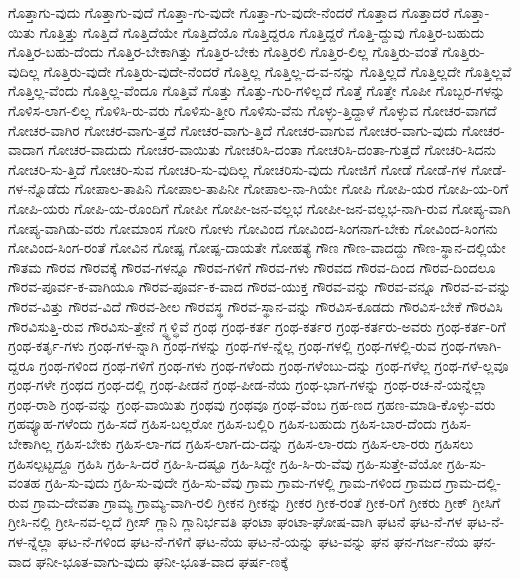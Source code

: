 {ಗೊತ್ತಾಗು-ವುದು
ಗೊತ್ತಾಗು-ವುದೆ
ಗೊತ್ತಾ-ಗು-ವುದೇ
ಗೊತ್ತಾ-ಗು-ವುದೇ-ನೆಂದರೆ
ಗೊತ್ತಾದ
ಗೊತ್ತಾದರೆ
ಗೊತ್ತಾ-ಯಿತು
ಗೊತ್ತಿತ್ತು
ಗೊತ್ತಿದೆ
ಗೊತ್ತಿದೆಯೇ
ಗೊತ್ತಿದೆಯೊ
ಗೊತ್ತಿದ್ದರೂ
ಗೊತ್ತಿದ್ದರೆ
ಗೊತ್ತಿ-ದ್ದುವು
ಗೊತ್ತಿರ-ಬಹುದು
ಗೊತ್ತಿರ-ಬಹು-ದೆಂದು
ಗೊತ್ತಿರ-ಬೇಕಾಗಿತ್ತು
ಗೊತ್ತಿರ-ಬೇಕು
ಗೊತ್ತಿರಲಿ
ಗೊತ್ತಿರ-ಲಿಲ್ಲ
ಗೊತ್ತಿರು-ವಂತೆ
ಗೊತ್ತಿರು-ವುದಿಲ್ಲ
ಗೊತ್ತಿರು-ವುದೇ
ಗೊತ್ತಿರು-ವುದೇ-ನೆಂದರೆ
ಗೊತ್ತಿಲ್ಲ
ಗೊತ್ತಿಲ್ಲ-ದ-ವ-ನನ್ನು
ಗೊತ್ತಿಲ್ಲದೆ
ಗೊತ್ತಿಲ್ಲದೇ
ಗೊತ್ತಿಲ್ಲವೆ
ಗೊತ್ತಿಲ್ಲ-ವೆಂದು
ಗೊತ್ತಿಲ್ಲ-ವೆಂದೂ
ಗೊತ್ತಿವೆ
ಗೊತ್ತು
ಗೊತ್ತು-ಗುರಿ-ಗಳಿಲ್ಲದೆ
ಗೊತ್ತೆ
ಗೊತ್ತೇ
ಗೊಪೀ
ಗೊಬ್ಬರ-ಗಳನ್ನು
ಗೊಳಿಸ-ಲಾಗ-ಲಿಲ್ಲ
ಗೊಳಿಸಿ-ರು-ವರು
ಗೊಳಿಸು-ತ್ತೀರಿ
ಗೊಳಿಸು-ವೆನು
ಗೊಳ್ಳು-ತ್ತಿದ್ದಾಳೆ
ಗೊಳ್ಳುವ
ಗೋಚರ-ವಾಗದೆ
ಗೋಚರ-ವಾಗಿರ
ಗೋಚರ-ವಾಗು-ತ್ತದೆ
ಗೋಚರ-ವಾಗು-ತ್ತಿದೆ
ಗೋಚರ-ವಾಗುವ
ಗೋಚರ-ವಾಗು-ವುದು
ಗೋಚರ-ವಾದಾಗ
ಗೋಚರ-ವಾದುದು
ಗೋಚರ-ವಾಯಿತು
ಗೋಚರಿಸಿ-ದಂತಾ
ಗೋಚರಿಸಿ-ದಂತಾ-ಗುತ್ತದೆ
ಗೋಚರಿ-ಸಿದನು
ಗೋಚರಿ-ಸು-ತ್ತಿದೆ
ಗೋಚರಿ-ಸುವ
ಗೋಚರಿ-ಸು-ವುದಿಲ್ಲ
ಗೋಚರಿಸು-ವುದು
ಗೋಜಿಗೆ
ಗೋಡೆ
ಗೋಡೆ-ಗಳ
ಗೋಡೆ-ಗಳ-ನ್ನೊಡೆದು
ಗೋಪಾಲ-ತಾಪಿನಿ
ಗೋಪಾಲ-ತಾಪಿನೀ
ಗೋಪಾಲ-ನಾ-ಗಿಯೇ
ಗೋಪಿ
ಗೋಪಿ-ಯರ
ಗೋಪಿ-ಯ-ರಿಗೆ
ಗೋಪಿ-ಯರು
ಗೋಪಿ-ಯ-ರೊಂದಿಗೆ
ಗೋಪೀ
ಗೋಪೀ-ಜನ-ವಲ್ಲಭ
ಗೋಪೀ-ಜನ-ವಲ್ಲಭ-ನಾಗಿ-ರುವ
ಗೋಪ್ಯ-ವಾಗಿ
ಗೋಪ್ಯ-ವಾಗಿಡು-ವರು
ಗೋಮಾಂಸ
ಗೋರಿ
ಗೋಳು
ಗೋವಿಂದ
ಗೋವಿಂದ-ಸಿಂಗನಾಗ-ಬೇಕು
ಗೋವಿಂದ-ಸಿಂಗನು
ಗೋವಿಂದ-ಸಿಂಗ-ರಂತೆ
ಗೋವಿನ
ಗೋಷ್ಪ
ಗೋಷ್ಪ-ದಾಯತೇ
ಗೋಹತ್ಯೆ
ಗೌಣ
ಗೌಣ-ವಾದದ್ದು
ಗೌಣ-ಸ್ಥಾನ-ದಲ್ಲಿಯೇ
ಗೌತಮ
ಗೌರವ
ಗೌರವಕ್ಕೆ
ಗೌರವ-ಗಳನ್ನೂ
ಗೌರವ-ಗಳಿಗೆ
ಗೌರವ-ಗಳು
ಗೌರವದ
ಗೌರವ-ದಿಂದ
ಗೌರವ-ದಿಂದಲೂ
ಗೌರವ-ಪೂರ್ವ-ಕ-ವಾಗಿಯೂ
ಗೌರವ-ಪೂರ್ವ-ಕ-ವಾದ
ಗೌರವ-ಯುಕ್ತ
ಗೌರವ-ವನ್ನು
ಗೌರವ-ವನ್ನೂ
ಗೌರವ-ವ-ವನ್ನು
ಗೌರವ-ವಿತ್ತು
ಗೌರವ-ವಿದೆ
ಗೌರವ-ಶೀಲ
ಗೌರವಸ್ಥ
ಗೌರವ-ಸ್ಥಾನ-ವನ್ನು
ಗೌರವಿಸ-ಕೂಡದು
ಗೌರವಿಸ-ಬೇಕೆ
ಗೌರವಿಸಿ
ಗೌರವಿಸುತ್ತಿ-ರುವ
ಗೌರವಿಸು-ತ್ತೇನೆ
ಗ್ಧ್ಧಳ್ಧಿವೆ
ಗ್ರಂಥ
ಗ್ರಂಥ-ಕರ್ತ
ಗ್ರಂಥ-ಕರ್ತರ
ಗ್ರಂಥ-ಕರ್ತರು-ಅವರು
ಗ್ರಂಥ-ಕರ್ತ-ರಿಗೆ
ಗ್ರಂಥ-ಕರ್ತೃ-ಗಳು
ಗ್ರಂಥ-ಗಳ-ನ್ನಾಗಿ
ಗ್ರಂಥ-ಗಳನ್ನು
ಗ್ರಂಥ-ಗಳ-ನ್ನೆಲ್ಲ
ಗ್ರಂಥ-ಗಳಲ್ಲಿ
ಗ್ರಂಥ-ಗಳಲ್ಲಿ-ರುವ
ಗ್ರಂಥ-ಗಳಾಗಿ-ದ್ದರೂ
ಗ್ರಂಥ-ಗಳಿಂದ
ಗ್ರಂಥ-ಗಳಿಗೆ
ಗ್ರಂಥ-ಗಳು
ಗ್ರಂಥ-ಗಳೆಂದು
ಗ್ರಂಥ-ಗಳೆಂಬು-ದನ್ನು
ಗ್ರಂಥ-ಗಳೆಲ್ಲ
ಗ್ರಂಥ-ಗಳೆ-ಲ್ಲವೂ
ಗ್ರಂಥ-ಗಳೇ
ಗ್ರಂಥದ
ಗ್ರಂಥ-ದಲ್ಲಿ
ಗ್ರಂಥ-ಪೀಡನೆ
ಗ್ರಂಥ-ಪೀಡ-ನೆಯ
ಗ್ರಂಥ-ಭಾಗ-ಗಳನ್ನು
ಗ್ರಂಥ-ರಚ-ನೆ-ಯನ್ನೆಲ್ಲಾ
ಗ್ರಂಥ-ರಾಶಿ
ಗ್ರಂಥ-ವನ್ನು
ಗ್ರಂಥ-ವಾಯಿತು
ಗ್ರಂಥವು
ಗ್ರಂಥವೂ
ಗ್ರಂಥ-ವೆಂಬ
ಗ್ರಹ-ಣದ
ಗ್ರಹಣ-ಮಾಡಿ-ಕೊಳ್ಳು-ವರು
ಗ್ರಹವ್ಯೂಹ-ಗಳೆಂದು
ಗ್ರಹಿ-ಸದೆ
ಗ್ರಹಿಸ-ಬಲ್ಲರೋ
ಗ್ರಹಿಸ-ಬಲ್ಲಿರಿ
ಗ್ರಹಿಸ-ಬಹುದು
ಗ್ರಹಿಸ-ಬಾರ-ದೆಂದು
ಗ್ರಹಿಸ-ಬೇಕಾಗಿಲ್ಲ
ಗ್ರಹಿಸ-ಬೇಕು
ಗ್ರಹಿಸ-ಲಾ-ಗದ
ಗ್ರಹಿಸ-ಲಾಗ-ದು-ದನ್ನು
ಗ್ರಹಿಸ-ಲಾ-ರದು
ಗ್ರಹಿಸ-ಲಾ-ರರು
ಗ್ರಹಿಸಲು
ಗ್ರಹಿಸಲ್ಪಟ್ಟದ್ದೂ
ಗ್ರಹಿಸಿ
ಗ್ರಹಿ-ಸಿ-ದರೆ
ಗ್ರಹಿ-ಸಿ-ದಷ್ಟೂ
ಗ್ರಹಿ-ಸಿದ್ದೇ
ಗ್ರಹಿ-ಸಿ-ರು-ವೆವು
ಗ್ರಹಿ-ಸುತ್ತೇ-ವೆಯೋ
ಗ್ರಹಿ-ಸು-ವಂತಹ
ಗ್ರಹಿ-ಸು-ವುದು
ಗ್ರಹಿ-ಸು-ವುದೇ
ಗ್ರಹಿ-ಸು-ವೆವು
ಗ್ರಾಮ
ಗ್ರಾಮ-ಗಳಲ್ಲಿ
ಗ್ರಾಮ-ಗಳಿಂದ
ಗ್ರಾಮದ
ಗ್ರಾಮ-ದಲ್ಲಿ-ರುವ
ಗ್ರಾಮ-ದೇವತಾ
ಗ್ರಾಮ್ಯ
ಗ್ರಾಮ್ಯ-ವಾಗಿ-ರಲಿ
ಗ್ರೀಕನ
ಗ್ರೀಕನ್ನು
ಗ್ರೀಕರ
ಗ್ರೀಕ-ರಂತೆ
ಗ್ರೀಕ-ರಿಗೆ
ಗ್ರೀಕರು
ಗ್ರೀಕ್
ಗ್ರೀಸಿಗೆ
ಗ್ರೀಸಿ-ನಲ್ಲಿ
ಗ್ರೀಸಿ-ನವ-ಲ್ಲದೆ
ಗ್ರೀಸ್
ಗ್ಲಾನಿ
ಗ್ಲಾನಿರ್ಭವತಿ
ಘಂಟಾ
ಘಂಟಾ-ಘೋಷ-ವಾಗಿ
ಘಟನೆ
ಘಟ-ನೆ-ಗಳ
ಘಟ-ನೆ-ಗಳ-ನ್ನೆಲ್ಲಾ
ಘಟ-ನೆ-ಗಳಿಂದ
ಘಟ-ನೆ-ಗಳಿಗೆ
ಘಟ-ನೆಯ
ಘಟ-ನೆ-ಯನ್ನು
ಘಟ-ವನ್ನು
ಘನ
ಘನ-ಗರ್ಜ-ನೆಯ
ಘನ-ವಾದ
ಘನೀ-ಭೂತ-ವಾಗು-ವುದು
ಘನೀ-ಭೂತ-ವಾದ
ಘರ್ಷ-ಣಕ್ಕೆ
}

